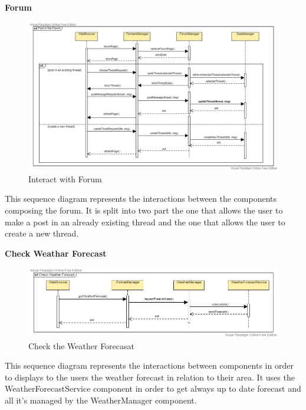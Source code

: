 \documentclass[table, 12pt]{article}
\begin{document}
\newpage
\textbf{Forum}
\begin{center}
    \begin{figure}[H]
        \includegraphics[scale=0.55, center]{assets/SequenceDiagram/Forum.jpg}
        \caption{Interact with Forum}
        \label{fig: forum}
    \end{figure}
\end{center}
This sequence diagram represents the interactions between the components composing the forum. 
It is split into two part the one that allows the user to make a post in an already existing thread and the one that allows the user to create a new thread.

\newpage
\textbf{Check Weathar Forecast}
\begin{center}
    \begin{figure}[H]
        \includegraphics[scale=0.6, center]{assets/SequenceDiagram/Forecast.jpg}
        \caption{Check the Weather Forecasat}
        \label{fig: forecast}
    \end{figure}
\end{center}
This sequence diagram represents the interactions between components in order to displays to the users the weather forecast in relation to their area.
It uses the WeatherForecastService component in order to get always up to date forecast and all it's managed by the WeatherManager component.
\end{document}
